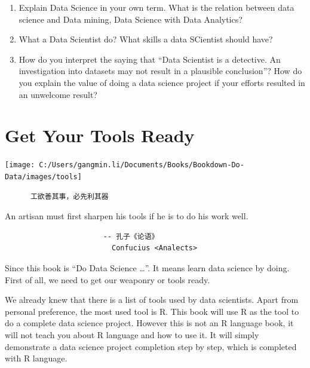 \documentclass[
]{book}
\providecommand{\tightlist}{%
  \setlength{\itemsep}{0pt}\setlength{\parskip}{0pt}}
\renewenvironment{quote}{\begin{VF}}{\end{VF}}
\begin{document}
\begin{enumerate}
\def\labelenumi{\arabic{enumi}.}
\tightlist
\item
  Explain Data Science in your own term. What is the relation between data science and Data mining, Data Science with Data Analytics?
\item
  What a Data Scientist do? What skills a data SCientist should have?
\item
  How do you interpret the saying that ``Data Scientist is a detective. An investigation into datasets may not result in a plausible conclusion''? How do you explain the value of doing a data science project if your efforts resulted in an unwelcome result?
\end{enumerate}

\hypertarget{tools}{%
\chapter{Get Your Tools Ready}\label{tools}}

\begin{center}\texttt{[image: C:/Users/gangmin.li/Documents/Books/Bookdown-Do-Data/images/tools]} \end{center}

\begin{quote}
\begin{verbatim}
      工欲善其事，必先利其器
\end{verbatim}

An artisan must first sharpen his tools if he is to do
his work well.

\begin{verbatim}
                       -- 孔子《论语》
                         Confucius <Analects>
\end{verbatim}
\end{quote}

Since this book is ``Do Data Science \ldots{}''. It means learn data science by doing. First of all, we need to get our weaponry or tools ready.

We already knew that there is a list of tools used by data scientists. Apart from personal preference, the most used tool is R. This book will use R as the tool to do a complete data science project. However this is not an R language book\citep{Black2021}, it will not teach you about R language and how to use it. It will simply demonstrate a data science project completion step by step, which is completed with R language\citep{Wickham2021}.
\end{document}
